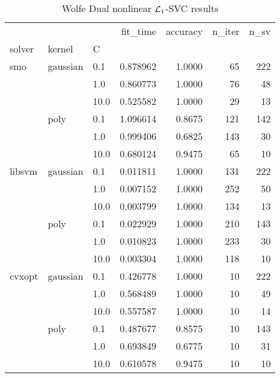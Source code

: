 \begin{table}[H]
\centering
\caption{Wolfe Dual nonlinear $\protect \mathcal{L}_1$-SVC results}
\label{nonlinear_dual_l1_svc_cv_results}
\begin{tabular}{lllrrrr}
\toprule
       &      &      &  fit\_time &  accuracy &  n\_iter &  n\_sv \\
solver & kernel & C &           &           &         &       \\
\midrule
smo & gaussian & 0.1  &  0.878962 &    1.0000 &      65 &   222 \\
       &      & 1.0  &  0.860773 &    1.0000 &      76 &    48 \\
       &      & 10.0 &  0.525582 &    1.0000 &      29 &    13 \\
       & poly & 0.1  &  1.096614 &    0.8675 &     121 &   142 \\
       &      & 1.0  &  0.999406 &    0.6825 &     143 &    30 \\
       &      & 10.0 &  0.680124 &    0.9475 &      65 &    10 \\
libsvm & gaussian & 0.1  &  0.011811 &    1.0000 &     131 &   222 \\
       &      & 1.0  &  0.007152 &    1.0000 &     252 &    50 \\
       &      & 10.0 &  0.003799 &    1.0000 &     134 &    13 \\
       & poly & 0.1  &  0.022929 &    1.0000 &     210 &   143 \\
       &      & 1.0  &  0.010823 &    1.0000 &     233 &    30 \\
       &      & 10.0 &  0.003304 &    1.0000 &     118 &    10 \\
cvxopt & gaussian & 0.1  &  0.426778 &    1.0000 &      10 &   222 \\
       &      & 1.0  &  0.568489 &    1.0000 &      10 &    49 \\
       &      & 10.0 &  0.557587 &    1.0000 &      10 &    14 \\
       & poly & 0.1  &  0.487677 &    0.8575 &      10 &   143 \\
       &      & 1.0  &  0.693849 &    0.6775 &      10 &    31 \\
       &      & 10.0 &  0.610578 &    0.9475 &      10 &    10 \\
\bottomrule
\end{tabular}
\end{table}
